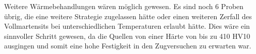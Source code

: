\documentclass[a4paper, 11pt]{tubsreprt}
\begin{document}
Weitere Wärmebehandlungen wären möglich gewesen. Es sind noch 6 Proben übrig, die eine weitere Strategie zugelassen hätte oder einen weiteren Zerfall des Vollmartensits bei unterschiedlichen Temperaturen erlaubt hätte. Dies wäre ein sinnvoller Schritt gewesen, da die Quellen von einer Härte von bis zu 410 HV10 ausgingen und somit eine hohe Festigkeit in den Zugversuchen zu erwarten war.



\listoffigures
\listoftables
\end{document}
